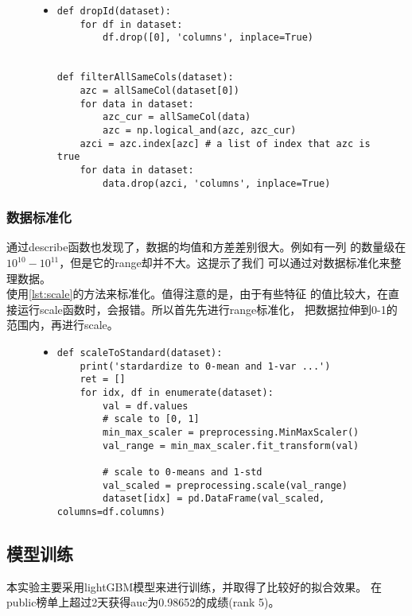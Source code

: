\documentclass[a4paper]{article}
\begin{document}
\begin{figure}[!hbt]
\begin{itemize}
\item[] \begin{lstlisting}[style=mypython, label=lst:del, caption=删去id和删去等值特征]
def dropId(dataset):
    for df in dataset:
        df.drop([0], 'columns', inplace=True)
        

def filterAllSameCols(dataset):
    azc = allSameCol(dataset[0])
    for data in dataset:
        azc_cur = allSameCol(data)
        azc = np.logical_and(azc, azc_cur)
    azci = azc.index[azc] # a list of index that azc is true
    for data in dataset:
        data.drop(azci, 'columns', inplace=True)
\end{lstlisting}
\end{itemize}
\end{figure}

\subsubsection{数据标准化}
通过describe函数也发现了，数据的均值和方差差别很大。例如有一列
的数量级在$10^10 - 10^11$，但是它的range却并不大。这提示了我们
可以通过对数据标准化来整理数据。\\

使用\autoref{lst:scale}的方法来标准化。值得注意的是，由于有些特征
的值比较大，在直接运行scale函数时，会报错。所以首先先进行range标准化，
把数据拉伸到0-1的范围内，再进行scale。

\begin{figure}[!hbt]
\begin{itemize}
\item[] \begin{lstlisting}[style=mypython, label=lst:scale, caption=数据标准化]
def scaleToStandard(dataset):
    print('stardardize to 0-mean and 1-var ...')
    ret = []
    for idx, df in enumerate(dataset):
        val = df.values
        # scale to [0, 1]
        min_max_scaler = preprocessing.MinMaxScaler()
        val_range = min_max_scaler.fit_transform(val)

        # scale to 0-means and 1-std
        val_scaled = preprocessing.scale(val_range)
        dataset[idx] = pd.DataFrame(val_scaled, columns=df.columns)
\end{lstlisting}
\end{itemize}
\end{figure}

\subsection{模型训练}\label{subsec:train}
本实验主要采用lightGBM模型来进行训练，并取得了比较好的拟合效果。
在public榜单上超过2天获得auc为0.98652的成绩(rank 5)。
\end{document}
